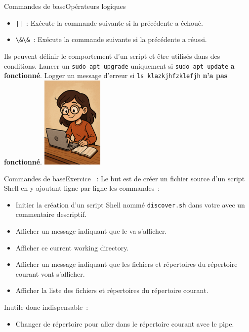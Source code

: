 \documentclass{beamer}
\begin{document}
    \begin{frame}{Commandes de base}{Opérateurs logiques}
        \begin{itemize}
            \item \lstinline{||}~: Exécute la commande suivante si la précédente a échoué.
            \item \lstinline{\&\&}~: Exécute la commande suivante si la précédente a réussi.
        \end{itemize}
        Ils peuvent définir le comportement d'un script et être utilisés dans des conditions.
        \bigbreak
        Lancer un \lstinline{sudo apt upgrade} uniquement si \lstinline{sudo apt update} \textbf{a fonctionné}.
        \bigbreak
        Logger un message d'erreur si \lstinline{ls klazkjhfzklefjh} \textbf{n'a pas fonctionné}.
        \bigbreak
        \centering
        \includegraphics[width=3cm]{image/student-in-front-of-desktop}
    \end{frame}

    \begin{frame}{Commandes de base}{Exercice \execcounterdispinc{}~:}
        Le but est de créer un fichier source d'un script Shell en y ajoutant ligne par ligne les commandes~:
        \begin{itemize}
            \item Initier la création d'un script Shell nommé \lstinline{discover.sh} dans votre  avec un commentaire descriptif.
            \item Afficher un message indiquant que le  va s'afficher.
            \item Afficher ce current working directory.
            \item Afficher un message indiquant que les fichiers et répertoires du répertoire courant vont s'afficher.
            \item Afficher la liste des fichiers et répertoires du répertoire courant.
        \end{itemize}

        Inutile donc indispensable~:
        \begin{itemize}
            \item Changer de répertoire pour aller dans le répertoire courant avec le pipe.
        \end{itemize}
    \end{frame}
\end{document}
